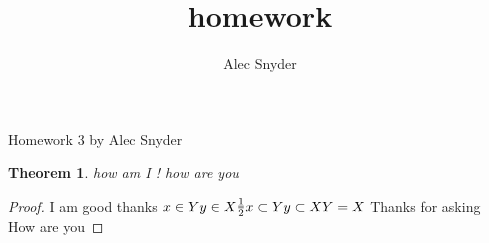 \documentclass[12pt]{article}
\author{Alec Snyder}
\title{homework}
\newcommand{\fr}[2]{\frac{\underline{#1}}{#2}}
\begin{document}
\begin{center}
Homework 3 by Alec Snyder
\end{center}
\newtheorem{theorem}{Theorem}[section]
\begin{theorem} 
how am I !
how are you
\end{theorem}
\begin{proof}
I am good thanks 
$
x\in Y
y\in X
\fr{1}{2}
x\subset Y
y\subset X \\
Y=X
$
Thanks for asking \\
How are you
\end{proof}
\end{document}

